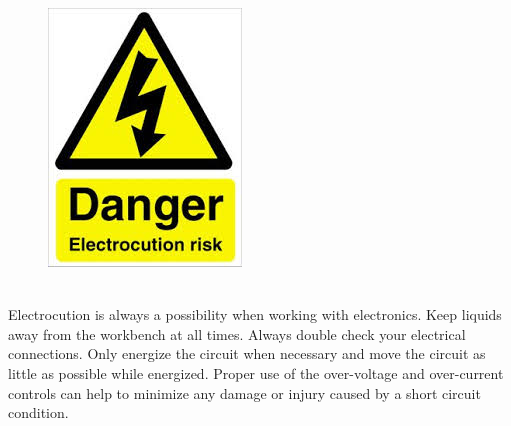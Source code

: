 \begin{framed}
\begin{figure}
\includegraphics[width=\linewidth]{images/electrocution_hazard.jpg}
\end{figure}
\ \\
Electrocution is always a possibility when working with electronics. Keep liquids away from the workbench at all times. Always double check your electrical connections. Only energize the circuit when necessary and move the circuit as little as possible while energized. Proper use of the over-voltage and over-current controls can help to minimize any damage or injury caused by a short circuit condition.
\end{framed}
\ \\
\ \\
